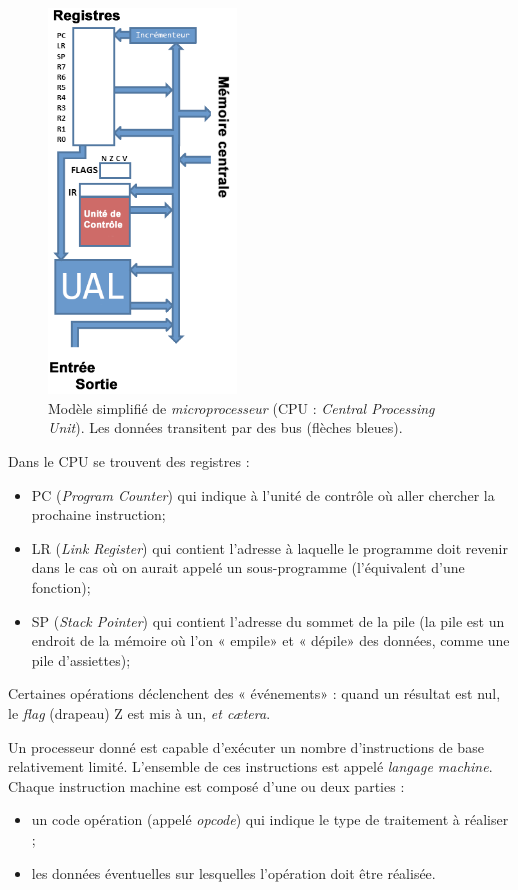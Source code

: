 \begin{figure}[H]
    \begin{center}
        \includegraphics[width=5cm]{ch-turing/img/vn2.png}
    \end{center}
    \caption*{Modèle simplifié de \textit{microprocesseur} (CPU : \textit{Central Processing Unit}).
        Les données transitent par des bus (flèches bleues).}
\end{figure}



Dans le CPU se trouvent des registres :
\begin{itemize}
    \item 	PC (\textit{Program Counter}) qui indique à l'unité de contrôle où aller chercher la prochaine instruction;
    \item 	LR	(\textit{Link Register}) qui contient l'adresse à laquelle le programme doit revenir dans le cas où on aurait appelé un sous-programme (l'équivalent d'une fonction);
    \item 	SP (\textit{Stack Pointer}) qui contient l'adresse du sommet de la pile (la pile est un endroit de la mémoire où l'on « empile»  et « dépile»  des données, comme une pile d'assiettes);
\end{itemize}
Certaines opérations déclenchent des « événements»  : quand un résultat est nul, le \textit{flag} (drapeau) Z est mis à un, \textit{et c\ae tera}.

Un processeur donné est capable d'exécuter un nombre d'instructions de base relativement limité. L'ensemble de ces instructions est appelé \textit{langage machine}. Chaque instruction machine est composé d'une ou deux parties :
\begin{itemize}
    \item 	un code opération (appelé \textit{opcode}) qui indique le type de traitement à réaliser ;
    \item 	les données éventuelles sur lesquelles l'opération doit être réalisée.
\end{itemize}

